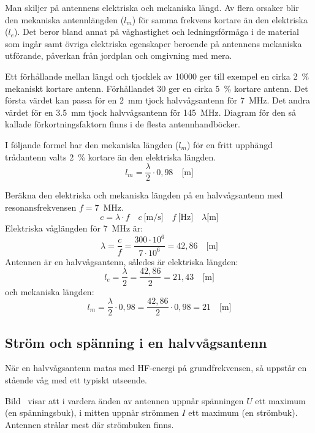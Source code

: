 Man skiljer på antennens elektriska och mekaniska längd.
Av flera orsaker blir den mekaniska antennlängden (\(l_m\)) för samma frekvens
kortare än den elektriska (\(l_e\)).
Det beror bland annat på våghastighet och ledningsförmåga i de material som
ingår samt övriga elektriska egenskaper beroende på antennens mekaniska
utförande, påverkan från jordplan och omgivning med mera.

Ett förhållande mellan längd och tjocklek av 10000 ger till exempel en cirka 2~\%
mekaniskt kortare antenn.
Förhållandet 30 ger en cirka 5~\% kortare antenn.
Det första värdet kan passa för en \qty{2}{\milli\metre} tjock halvvågsantenn
för \qty{7}{\mega\hertz}.
Det andra värdet för en \qty{3,5}{\milli\metre} tjock halvvågsantenn för
\qty{145}{\mega\hertz}.
Diagram för den så kallade förkortningsfaktorn finns i de flesta
antennhandböcker.

I följande formel har den mekaniska längden (\(l_m\)) för en fritt upphängd
trådantenn valts 2~\% kortare än den elektriska längden.
\[l_m = \frac{\lambda}{2} \cdot 0,98 \quad \text{[m]}\]
\begin{exempelbox}
Beräkna den elektriska och mekaniska längden på en halvvågsantenn med
resonansfrekvensen \(f = 7\)~MHz.
\[
c = \lambda \cdot f
\quad c\ \text{[m/s]} \quad f\ \text{[Hz]} \quad \lambda \text{[m]}
\]
\tcblower
Elektriska våglängden för \qty{7}{\mega\hertz} är:
\[
\lambda = \frac{c}{f} = \frac{300 \cdot 10^6}{7 \cdot 10^6} = 42,86
\quad \text{[m]}
\]
Antennen är en halvvågsantenn, således är elektriska längden:
\[
l_e = \frac{\lambda}{2} = \frac{42,86}{2} = 21,43 \quad \text{[m]}
\]
och mekaniska längden:
\[
l_m = \frac{\lambda}{2} \cdot 0,98 = \frac{42,86}{2}\cdot 0,98 = 21
\quad \text{[m]}
\]
\end{exempelbox}

\newpage
\subsection{Ström och spänning i en halvvågs\-antenn}


När en halvvågsantenn matas med HF-energi på grundfrekvensen, så uppstår en
stående våg med ett typiskt utseende.

Bild~ visar att i vardera änden av antennen uppnår spänningen
\(U\) ett maximum (en spänningsbuk), i mitten uppnår strömmen \(I\)
ett maximum (en strömbuk).
Antennen strålar mest där strömbuken finns.

